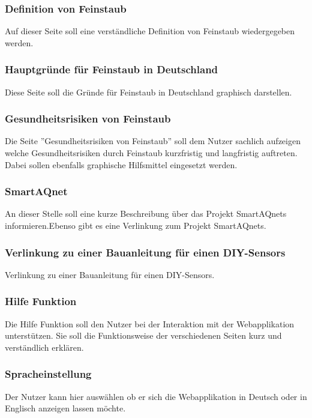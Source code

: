 \subsubsection{Definition von Feinstaub}
Auf dieser Seite soll eine verständliche Definition von Feinstaub wiedergegeben werden.


\subsubsection{Hauptgründe für Feinstaub in Deutschland}
Diese Seite soll die Gründe für Feinstaub in Deutschland graphisch darstellen.


\subsubsection{Gesundheitsrisiken von Feinstaub}
Die Seite ''Gesundheitsrisiken von Feinstaub'' soll dem Nutzer sachlich aufzeigen welche Gesundheitsrisiken durch Feinstaub kurzfristig und langfristig auftreten. Dabei sollen ebenfalls graphische Hilfsmittel eingesetzt werden.

\subsubsection{SmartAQnet}
An dieser Stelle soll eine kurze Beschreibung über das Projekt \glspl{SmartAQnet} informieren.Ebenso gibt es eine Verlinkung zum Projekt \glspl{SmartAQnet}.

\subsubsection{Verlinkung zu einer Bauanleitung für einen \glspl{DIY-Sensor}}
Verlinkung zu einer Bauanleitung für einen \glspl{DIY-Sensor}.

\subsubsection{Hilfe Funktion}
Die Hilfe Funktion soll den Nutzer bei der Interaktion mit der Webapplikation unterstützen. Sie soll die Funktionsweise der verschiedenen Seiten kurz und verständlich erklären.

\subsubsection{Spracheinstellung}
Der Nutzer kann hier auswählen ob er sich die Webapplikation in Deutsch oder in Englisch anzeigen lassen möchte.


